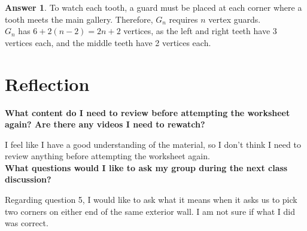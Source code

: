\documentclass[article, 12pt]{article}
\theoremstyle{definition}
\newtheorem{answer}{Answer}
\begin{document}
    \begin{answer}
        To watch each tooth, a guard must be placed at each corner where a tooth meets the main gallery. Therefore, $G_n$ requires $n$ vertex guards. 
        \\[12pt]
        $G_n$ has $6 + 2(n-2) = 2n + 2$ vertices, as the left and right teeth have 3 vertices each, and the middle teeth have 2 vertices each.
    \end{answer}
    \section*{Reflection}
    \textbf{What content do I need to review before attempting the worksheet again? Are there any videos I need to rewatch?}

    I feel like I have a good understanding of the material, so I don't think I need to review anything before attempting the worksheet again.
    \\[12pt]
    \textbf{What questions would I like to ask my group during the next class discussion?}

    Regarding question 5, I would like to ask what it means when it asks us to pick two corners on either end of the same exterior wall. I am not sure if what I did was correct.
\end{document}
